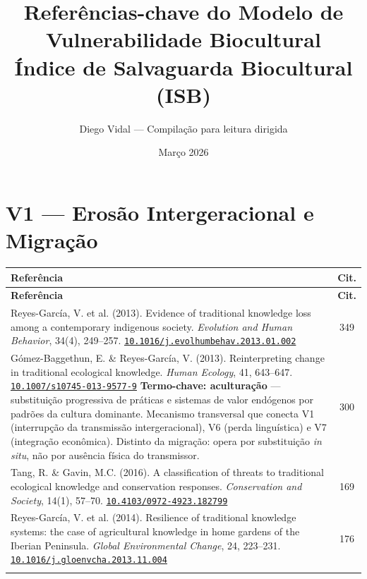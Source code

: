 \documentclass[a4paper,11pt]{article}
\title{\textbf{Referências-chave do Modelo de Vulnerabilidade Biocultural}\\[6pt]
\large Índice de Salvaguarda Biocultural (ISB)}
\author{Diego Vidal --- Compilação para leitura dirigida}
\date{Março 2026}
\newcommand{\doi}[1]{\href{https://doi.org/#1}{\texttt{#1}}}
\begin{document}
\maketitle
\tableofcontents
\newpage

\section{V1 --- Erosão Intergeracional e Migração}

\begin{longtable}{>{\raggedright\arraybackslash}p{} c}
\toprule
\textbf{Referência} & \textbf{Cit.} \\
\midrule
\endfirsthead
\toprule
\textbf{Referência} & \textbf{Cit.} \\
\midrule
\endhead

Reyes-García, V. et al. (2013). Evidence of traditional knowledge loss among a contemporary indigenous society. \textit{Evolution and Human Behavior}, 34(4), 249--257.\newline
\doi{10.1016/j.evolhumbehav.2013.01.002} & 349 \\
\addlinespace

Gómez-Baggethun, E. \& Reyes-García, V. (2013). Reinterpreting change in traditional ecological knowledge. \textit{Human Ecology}, 41, 643--647.\newline
\doi{10.1007/s10745-013-9577-9}\newline
\textcolor{blue!70!black}{\scriptsize\textbf{Termo-chave: aculturação} --- substitui\c{c}ão progressiva de práticas e sistemas de valor endógenos por padrões da cultura dominante. Mecanismo transversal que conecta V1 (interrup\c{c}ão da transmissão intergeracional), V6 (perda linguística) e V7 (integra\c{c}ão econômica). Distinto da migra\c{c}ão: opera por substitui\c{c}ão \textit{in situ}, não por ausência física do transmissor.} & 300 \\
\addlinespace

Tang, R. \& Gavin, M.C. (2016). A classification of threats to traditional ecological knowledge and conservation responses. \textit{Conservation and Society}, 14(1), 57--70.\newline
\doi{10.4103/0972-4923.182799} & 169 \\
\addlinespace

Reyes-García, V. et al. (2014). Resilience of traditional knowledge systems: the case of agricultural knowledge in home gardens of the Iberian Peninsula. \textit{Global Environmental Change}, 24, 223--231.\newline
\doi{10.1016/j.gloenvcha.2013.11.004} & 176 \\
\addlinespace


\end{longtable}
\end{document}
